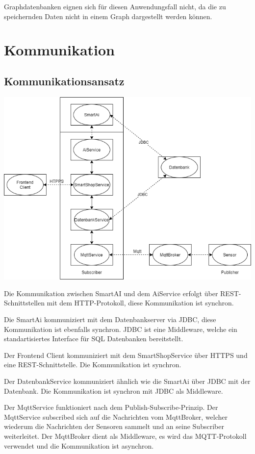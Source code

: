 \documentclass[runningheads]{llncs}
\begin{document}
Graphdatenbanken eignen sich für diesen Anwendungsfall nicht, da die zu speichernden Daten nicht in einem Graph dargestellt werden können.
\newpage

\section{Kommunikation}

\subsection{Kommunikationsansatz}
\includegraphics[width=\linewidth]{images/Kommunikation}

Die Kommunikation zwischen SmartAI und dem AiService erfolgt über REST-Schnittstellen mit dem HTTP-Protokoll, diese Kommunikation ist synchron.

Die SmartAi kommuniziert mit dem Datenbankserver via JDBC, diese Kommunikation ist ebenfalls synchron. JDBC ist eine Middleware, welche ein standartisiertes Interface für SQL Datenbanken bereitstellt.

Der Frontend Client kommuniziert mit dem SmartShopService über HTTPS und eine REST-Schnittstelle. Die Kommunikation ist synchron.

Der DatenbankService kommuniziert ähnlich wie die SmartAi über JDBC mit der Datenbank. Die Kommunikation ist synchron mit JDBC als Middleware.

Der MqttService funktioniert nach dem Publish-Subscribe-Prinzip. Der MqttService subscribed sich auf die Nachrichten vom MqttBroker, welcher wiederum die Nachrichten der Sensoren sammelt und an seine Subscriber weiterleitet.
Der MqttBroker dient als Middleware, es wird das MQTT-Protokoll verwendet und die Kommunikation ist asynchron.
\end{document}
